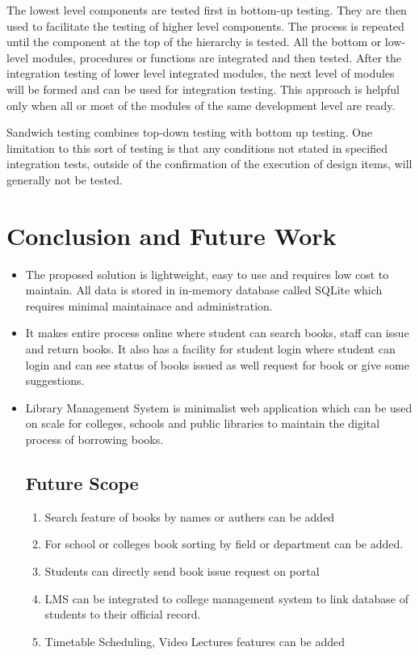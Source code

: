 \documentclass[12pt, a4paper]{report}
\begin{document}
The lowest level components are tested first in bottom-up testing. They are then used to facilitate the testing of higher level components. The process is repeated until the component at the top of the hierarchy is tested. All the bottom or low-level modules, procedures or functions are integrated and then tested. After the integration testing of lower level integrated modules, the next level of modules will be formed and can be used for integration testing. This approach is helpful only when all or most of the modules of the same development level are ready.


Sandwich testing combines top-down testing with bottom up testing. One limitation to this sort of testing is that any conditions not stated in specified integration tests, outside of the confirmation of the execution of design items, will generally not be tested.



\chapter{Conclusion and Future Work}
\begin{itemize}
	\item The proposed solution is lightweight, easy to use and requires low cost to maintain.
	All data is stored in in-memory database called SQLite which requires minimal maintainace and administration. 
	\item It makes entire process online where student can search books, staff can issue and return books. It also has a facility for student login where student can login and can see
	status of books issued as well request for book or give some suggestions.
	\item Library Management System is minimalist  web application which can be used on scale for colleges, schools and public libraries to maintain the digital process of borrowing books.
	
	\section{Future Scope}
	\begin{enumerate}
		\item Search feature of books by names or authers can be added
		\item For school or colleges book sorting by field or department can be added.
		\item Students can directly send book issue request on portal 
		\item LMS can be integrated to college management system to link database of students to their official record.
		\item Timetable Scheduling, Video Lectures features can be added
	\end{enumerate}
\end{itemize}
\end{document}
